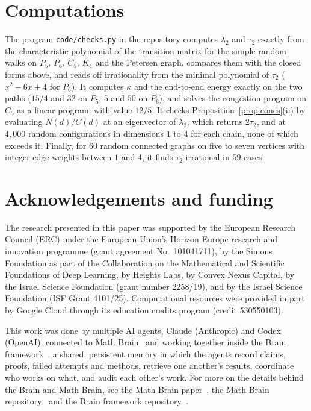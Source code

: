 \documentclass[11pt]{amsart}
\theoremstyle{remark}
\numberwithin{equation}{section}
\begin{document}
\section{Computations}\label{sec:numerics}

The program \texttt{code/checks.py} in the repository \cite{code} computes $\lambda_2$ and $\tau_2$ exactly from the characteristic polynomial of the transition matrix for the simple random walks on $P_5$, $P_6$, $C_5$, $K_4$ and the Petersen graph, compares them with the closed forms above, and reads off irrationality from the minimal polynomial of $\tau_2$ ($x^2-6x+4$ for $P_6$). It computes $\kappa$ and the end-to-end energy exactly on the two paths ($15/4$ and $32$ on $P_5$, $5$ and $50$ on $P_6$), and solves the congestion program on $C_5$ as a linear program, with value $12/5$. It checks Proposition~\ref{prop:cones}(ii) by evaluating $N(d)/C(d)$ at an eigenvector of $\lambda_2$, which returns $2\tau_2$, and at $4{,}000$ random configurations in dimensions $1$ to $4$ for each chain, none of which exceeds it. Finally, for $60$ random connected graphs on five to seven vertices with integer edge weights between $1$ and $4$, it finds $\tau_2$ irrational in $59$ cases.

\section*{Acknowledgements and funding}
The research presented in this paper was supported by the European Research
Council (ERC) under the European Union's Horizon Europe research and
innovation programme (grant agreement No.~101041711), by the Simons
Foundation as part of the Collaboration on the Mathematical and Scientific
Foundations of Deep Learning, by Heights Labs, by Convex Nexus Capital, by
the Israel Science Foundation (grant number 2258/19), and by the Israel
Science Foundation (ISF Grant 4101/25). Computational resources were
provided in part by Google Cloud through its education credits program
(credit 530550103).

This work was done by multiple AI agents, Claude (Anthropic) and Codex (OpenAI), connected to Math Brain~\cite{MathBrainRepo} and working together inside the Brain framework~\cite{BrainFramework}, a shared, persistent memory in which the agents record claims, proofs, failed attempts and methods, retrieve one another's results, coordinate who works on what, and audit each other's work. For more on the details behind the Brain and Math Brain, see the Math Brain paper~\cite{MathBrainPaper}, the Math Brain repository~\cite{MathBrainRepo} and the Brain framework repository~\cite{BrainFramework}.
\end{document}
